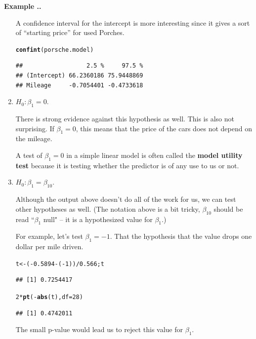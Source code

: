 \documentclass[twoside]{book}
\makeatletter
\newcommand{\hlnum}[1]{\textcolor[rgb]{0.686,0.059,0.569}{#1}}%
\newcommand{\hlopt}[1]{\textcolor[rgb]{0,0,0}{#1}}%
\newcommand{\hlstd}[1]{\textcolor[rgb]{0.345,0.345,0.345}{#1}}%
\newcommand{\hlkwb}[1]{\textcolor[rgb]{0.69,0.353,0.396}{#1}}%
\newcommand{\hlkwc}[1]{\textcolor[rgb]{0.333,0.667,0.333}{#1}}%
\newcommand{\hlkwd}[1]{\textcolor[rgb]{0.737,0.353,0.396}{\textbf{#1}}}%
\newenvironment{kframe}{%
 \def\at@end@of@kframe{}%
 \ifinner\ifhmode%
  \def\at@end@of@kframe{\end{minipage}}%
  \begin{minipage}{\columnwidth}%
 \fi\fi%
 \def\FrameCommand##1{\hskip\@totalleftmargin \hskip-\fboxsep
 \colorbox{shadecolor}{##1}\hskip-\fboxsep
     \hskip-\linewidth \hskip-\@totalleftmargin \hskip\columnwidth}%
 \MakeFramed {\advance\hsize-\width
   \@totalleftmargin\z@ \linewidth\hsize
   \@setminipage}}%
 {\par\unskip\endMakeFramed%
 \at@end@of@kframe}
\newenvironment{knitrout}{}{} %
\def\term#1{\textbf{#1}}
\newcounter{example}[section]
\newenvironment{example}%
{\refstepcounter{example}%
\textbf{Example \thesection.\arabic{example}. }}%
{}
\makeatother
\begin{document}
\begin{example}
\begin{enumerate}
		A confidence interval for the intercept is more interesting since it gives a sort 
		of ``starting price'' for used Porches.
\begin{knitrout}
\color{fgcolor}\begin{kframe}
\begin{alltt}
\hlkwd{confint}\hlstd{(porsche.model)}
\end{alltt}
\begin{verbatim}
##                  2.5 %     97.5 %
## (Intercept) 66.2360186 75.9448869
## Mileage     -0.7054401 -0.4733618
\end{verbatim}
\end{kframe}
\end{knitrout}


	\item
		$H_0: \beta_1 = 0$.

		There is strong evidence against this hypothesis as well.  This is also not surprising.
		If $\beta_1 = 0$, this means that the price of the cars does not depend on the mileage.

		A test of $\beta_1=0$ in a simple linear model is often called the \term{model utility test}
		because it is testing whether the predictor is of any use to us or not.

	\item
		$H_0: \beta_1 = \beta_{10}$.

		Although the output above doesn't do all of the work for us, we can test other
		hypotheses as well.  (The notation above is a bit tricky, $\beta_{10}$ should be read
		``$\beta_1$ null" -- it is a hypothesized value for $\beta_1$.)
		
		For example, let's test $\beta_1 = -1$.  That the hypothesis that the value 
		drops one dollar per mile driven.

\begin{knitrout}
\color{fgcolor}\begin{kframe}
\begin{alltt}
\hlstd{t} \hlkwb{<-} \hlstd{(}\hlopt{-}\hlnum{0.5894} \hlopt{-} \hlstd{(}\hlopt{-}\hlnum{1}\hlstd{) )} \hlopt{/} \hlnum{0.566}\hlstd{; t}
\end{alltt}
\begin{verbatim}
## [1] 0.7254417
\end{verbatim}
\begin{alltt}
\hlnum{2} \hlopt{*} \hlkwd{pt}\hlstd{(} \hlopt{-} \hlkwd{abs}\hlstd{(t),} \hlkwc{df}\hlstd{=}\hlnum{28} \hlstd{)}
\end{alltt}
\begin{verbatim}
## [1] 0.4742011
\end{verbatim}
\end{kframe}
\end{knitrout}
The small p-value would lead us to reject this value for $\beta_1$.
\end{enumerate}
\end{example}
\end{document}
